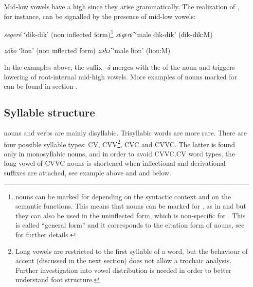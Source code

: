 \documentclass[output=paper]{LSP/langsci}
\begin{document}
Mid-low vowels have a high  since they arise grammatically. The realization of  , for instance, can be signalled by the presence of mid-low vowels:

 \begin{exe}
 	\ex \begin{xlist}
 	\ex \textit{segeré}\hspace{7mm} ʻdik-dik' (non inflected form)\footnote{ nouns can be marked for  depending on the syntactic context and on the semantic functions. This means that nouns can be marked for , as in  and  but they can also be used in the uninflected form, which is non-specific for . This is called “general form” and it corresponds to the citation form of nouns, see \citet{Petrollino2016} for further details.}
    \ex \textit{sɛgɛrɛ̂}\hspace{7mm} ʻmale dik-dik' \label{ex:Petrollino:dikdik} (dik-dik:M)
 	\end{xlist}
 \end{exe}
 
\begin{exe}
 	\ex \begin{xlist}
 	\ex \textit{zóbo}\hspace{10mm} ʻlion' (non inflected form)
    \ex \textit{zɔbɔ̂}\hspace{10mm} ʻmale lion' \label{ex:Petrollino:lion} (lion:M)
 	\end{xlist}
 \end{exe}
In the examples above, the  suffix \textit{-â} merges with the  of the noun and triggers lowering of root-internal mid-high vowels. More examples of nouns marked for   can be found in section .

\subsection{Syllable structure} \label{sec:Petrollino:Syllablestructure}

 nouns and verbs are mainly disyllabic. Trisyllabic words are more rare. There are four possible syllable types: CV, CVV\footnote{Long vowels are restricted to the first syllable of a word, but the behaviour of accent (discussed in the next section) does not allow a trochaic analysis. Further investigation into vowel distribution is needed in order to better understand foot structure.}, CVC and CVVC. The latter is found only in monosyllabic nouns, and in order to avoid CVVC.CV word types, the long vowel of CVVC nouns is shortened when inflectional and derivational suffixes are attached, see example  above and  and  below.
\end{document}
